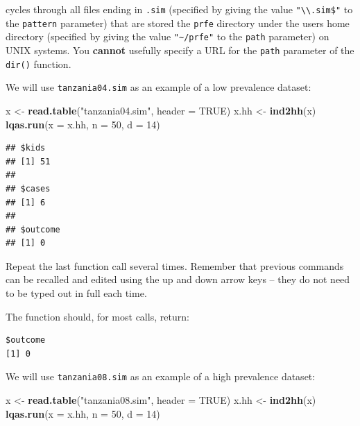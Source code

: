 \documentclass[12pt,a4paper]{book}
\newenvironment{Shaded}{\begin{snugshade}}{\end{snugshade}}
\newcommand{\DataTypeTok}[1]{\textcolor[rgb]{0.13,0.29,0.53}{#1}}
\newcommand{\DecValTok}[1]{\textcolor[rgb]{0.00,0.00,0.81}{#1}}
\newcommand{\KeywordTok}[1]{\textcolor[rgb]{0.13,0.29,0.53}{\textbf{#1}}}
\newcommand{\NormalTok}[1]{#1}
\newcommand{\OtherTok}[1]{\textcolor[rgb]{0.56,0.35,0.01}{#1}}
\newcommand{\StringTok}[1]{\textcolor[rgb]{0.31,0.60,0.02}{#1}}
\theoremstyle{definition}
\theoremstyle{definition}
\theoremstyle{definition}
\theoremstyle{remark}
\begin{document}
cycles through all files ending in \texttt{.sim} (specified by giving
the value \texttt{"\textbackslash{}\textbackslash{}.sim\$"} to the
\texttt{pattern} parameter) that are stored the \texttt{prfe} directory
under the users home directory (specified by giving the value
\texttt{"\textasciitilde{}/prfe"} to the \texttt{path} parameter) on
UNIX systems. You \textbf{cannot} usefully specify a URL for the
\texttt{path} parameter of the \texttt{dir()} function.

We will use \texttt{tanzania04.sim} as an example of a low prevalence
dataset:

\begin{Shaded}
\begin{Highlighting}[]
\NormalTok{x <-}\StringTok{ }\KeywordTok{read.table}\NormalTok{(}\StringTok{"tanzania04.sim"}\NormalTok{, }\DataTypeTok{header =} \OtherTok{TRUE}\NormalTok{)}
\NormalTok{x.hh <-}\StringTok{ }\KeywordTok{ind2hh}\NormalTok{(x)}
\KeywordTok{lqas.run}\NormalTok{(}\DataTypeTok{x =}\NormalTok{ x.hh, }\DataTypeTok{n =} \DecValTok{50}\NormalTok{, }\DataTypeTok{d =} \DecValTok{14}\NormalTok{)}
\end{Highlighting}
\end{Shaded}

\begin{verbatim}
## $kids
## [1] 51
## 
## $cases
## [1] 6
## 
## $outcome
## [1] 0
\end{verbatim}

Repeat the last function call several times. Remember that previous
commands can be recalled and edited using the up and down arrow keys --
they do not need to be typed out in full each time.

The function should, for most calls, return:

\begin{verbatim}
$outcome
[1] 0
\end{verbatim}

We will use \texttt{tanzania08.sim} as an example of a high prevalence
dataset:

\begin{Shaded}
\begin{Highlighting}[]
\NormalTok{x <-}\StringTok{ }\KeywordTok{read.table}\NormalTok{(}\StringTok{"tanzania08.sim"}\NormalTok{, }\DataTypeTok{header =} \OtherTok{TRUE}\NormalTok{)}
\NormalTok{x.hh <-}\StringTok{ }\KeywordTok{ind2hh}\NormalTok{(x)}
\KeywordTok{lqas.run}\NormalTok{(}\DataTypeTok{x =}\NormalTok{ x.hh, }\DataTypeTok{n =} \DecValTok{50}\NormalTok{, }\DataTypeTok{d =} \DecValTok{14}\NormalTok{)}
\end{Highlighting}
\end{Shaded}
\end{document}
